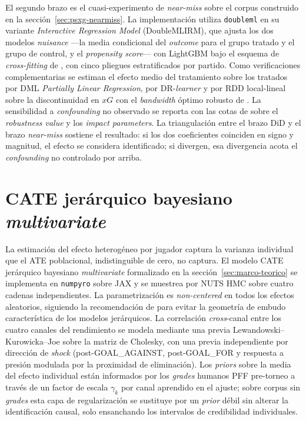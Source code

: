 El segundo brazo es el cuasi-experimento de \textit{near-miss} sobre
el corpus construido en la sección~\ref{sec:psxg-nearmiss}. La
implementación utiliza \texttt{doubleml} en su variante
\textit{Interactive Regression Model} (DoubleMLIRM), que ajusta los
dos modelos \textit{nuisance} ---la media condicional del
\textit{outcome} para el grupo tratado y el grupo de control, y el
\textit{propensity score}--- con LightGBM bajo el esquema de
\textit{cross-fitting} de \textcite{Chernozhukov2018DML}, con cinco
pliegues estratificados por partido. Como verificaciones
complementarias se estiman el efecto medio del tratamiento sobre los
tratados por DML \textit{Partially Linear Regression}, por
DR-\textit{learner} \parencite{Kennedy2023DR} y por RDD local-lineal
sobre la discontinuidad en $xG$ con el \textit{bandwidth} óptimo
robusto de \textcite{CalonicoCattaneoTitiunik2014}. La sensibilidad
a \textit{confounding} no observado se reporta con las cotas de
\textcite{CinelliHazlett2020} sobre el \textit{robustness value} y los
\textit{impact parameters}. La triangulación entre el brazo DiD y el
brazo \textit{near-miss} sostiene el resultado: si los dos coeficientes
coinciden en signo y magnitud, el efecto se considera identificado;
si divergen, esa divergencia acota el \textit{confounding} no
controlado por arriba.


\section{CATE jerárquico bayesiano \textit{multivariate}}
\label{sec:cate}

La estimación del efecto heterogéneo por jugador captura la varianza
individual que el ATE poblacional, indistinguible de cero, no captura. El modelo CATE jerárquico bayesiano
\textit{multivariate} formalizado en la sección~\ref{sec:marco-teorico}
se implementa en \texttt{numpyro} sobre JAX y se muestrea por NUTS
HMC sobre cuatro cadenas independientes. La parametrización es
\textit{non-centered} en todos los efectos aleatorios, siguiendo la
recomendación de \textcite{BetancourtGirolami2015} para evitar la
geometría de embudo característica de los modelos jerárquicos. La
correlación \textit{cross}-canal entre los cuatro canales del
rendimiento se modela mediante una previa Lewandowski--Kurowicka--Joe
sobre la matriz de Cholesky, con una previa independiente por
dirección de \textit{shock} (post-GOAL\_AGAINST, post-GOAL\_FOR y
respuesta a presión modulada por la proximidad de eliminación). Los
\textit{priors} sobre la media del efecto individual están informados
por los \textit{grades} humanos PFF pre-torneo a través de un factor
de escala $\gamma_k$ por canal aprendido en el ajuste; sobre corpus
sin \textit{grades} esta capa de regularización se sustituye por un
\textit{prior} débil sin alterar la identificación causal, solo
ensanchando los intervalos de credibilidad individuales.

